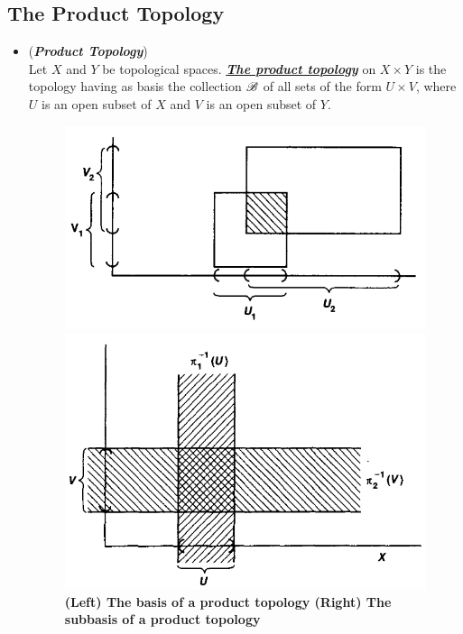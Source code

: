 \documentclass[11pt]{article}
\begin{document}
\subsection{The Product Topology}
\begin{itemize}
\item \begin{definition} (\emph{\textbf{Product Topology}})\\
Let $X$ and $Y$ be topological spaces. \underline{\emph{\textbf{The product topology}}} on $X \times Y$ is the topology having as basis the collection ${\mathscr B}$ of all sets of the form $U \times V$, where $U$ is an open subset of $X$ and $V$ is an open subset of $Y$.
\end{definition}

\begin{figure}
\begin{minipage}[t]{0.5\linewidth}
  \centering
  \centerline{\includegraphics[scale = 0.34]{basis_product_topology.png}}
\end{minipage}
\begin{minipage}[t]{0.5\linewidth}
  \centering
  \centerline{\includegraphics[scale = 0.34]{subbasis_product_topology.png}}
\end{minipage}
\caption{\footnotesize{\textbf{(Left) The basis of a product topology (Right) The subbasis of a product topology \citep{munkres2000topology}}}}
\label{fig: basis_product_topology}
\end{figure}



\end{itemize}
\end{document}

